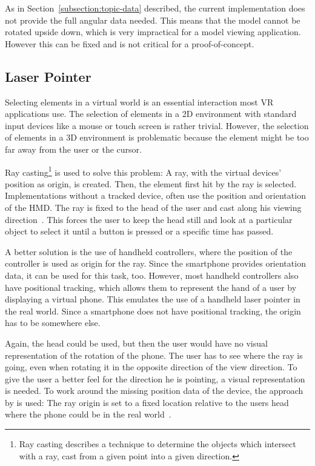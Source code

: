 As in Section~\ref{subsection:topic-data} described, the current implementation does not provide the full angular data needed. This means that the model cannot be rotated upside down, which is very impractical for a model viewing application. However this can be fixed and is not critical for a proof-of-concept.


\subsection{Laser Pointer}\label{subsection:laser-pointer}

Selecting elements in a virtual world is an essential interaction most \ac{VR} applications use. The selection of elements in a \ac{2D} environment with standard input devices like a mouse or touch screen is rather trivial. However, the selection of elements in a \ac{3D} environment is problematic because the element might be too far away from the user or the cursor. 

Ray casting\footnote{Ray casting describes a technique to determine the objects which intersect with a ray, cast from a given point into a given direction.} is used to solve this problem: A ray, with the virtual devices' position as origin, is created. Then, the element first hit by the ray is selected. Implementations without a tracked device, often use the position and orientation of the \ac{HMD}. The ray is fixed to the head of the user and cast along his viewing direction~\cite[23]{Kamm.2018}. This forces the user to keep the head still and look at a particular object to select it until a button is pressed or a specific time has passed.


A better solution is the use of handheld controllers, where the position of the controller is used as origin for the ray. Since the smartphone provides orientation data, it can be used for this task, too. However, most handheld controllers also have positional tracking, which allows them to represent the hand of a user by displaying a virtual phone. This emulates the use of a handheld laser pointer in the real world. Since a smartphone does not have positional tracking, the origin has to be somewhere else.

Again, the head could be used, but then the user would have no visual representation of the rotation of the phone. The user has to see where the ray is going, even when rotating it in the opposite direction of the view direction. To give the user a better feel for the direction he is pointing, a visual representation is needed. 
To work around the missing position data of the device, the approach by \citeauthor{Pietroszek.2014} is used: The ray origin is set to a fixed location relative to the users head where the phone could be in the real world~\cite[Figure 3]{Pietroszek.2014}. 

